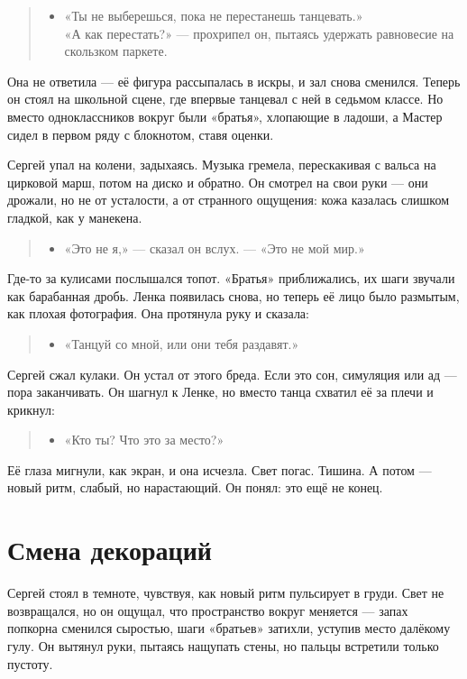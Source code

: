 \documentclass[12pt,a4paper]{book}
\newenvironment{dialogue}{\begin{quote}\itshape\begin{itemize}\item[]}{\end{itemize}\end{quote}}
\begin{document}
\begin{dialogue}
«Ты не выберешься, пока не перестанешь танцевать.» \\
«А как перестать?» --- прохрипел он, пытаясь удержать равновесие на скользком паркете.
\end{dialogue}

Она не ответила --- её фигура рассыпалась в искры, и зал снова сменился. Теперь он стоял на школьной сцене, где впервые танцевал с ней в седьмом классе. Но вместо одноклассников вокруг были «братья», хлопающие в ладоши, а Мастер сидел в первом ряду с блокнотом, ставя оценки.

Сергей упал на колени, задыхаясь. Музыка гремела, перескакивая с вальса на цирковой марш, потом на диско и обратно. Он смотрел на свои руки --- они дрожали, но не от усталости, а от странного ощущения: кожа казалась слишком гладкой, как у манекена.

\begin{dialogue}
«Это не я,» --- сказал он вслух. --- «Это не мой мир.»
\end{dialogue}

Где-то за кулисами послышался топот. «Братья» приближались, их шаги звучали как барабанная дробь. Ленка появилась снова, но теперь её лицо было размытым, как плохая фотография. Она протянула руку и сказала:

\begin{dialogue}
«Танцуй со мной, или они тебя раздавят.»
\end{dialogue}

Сергей сжал кулаки. Он устал от этого бреда. Если это сон, симуляция или ад --- пора заканчивать. Он шагнул к Ленке, но вместо танца схватил её за плечи и крикнул:

\begin{dialogue}
«Кто ты? Что это за место?»
\end{dialogue}

Её глаза мигнули, как экран, и она исчезла. Свет погас. Тишина. А потом --- новый ритм, слабый, но нарастающий. Он понял: это ещё не конец.

\section{Смена декораций}

Сергей стоял в темноте, чувствуя, как новый ритм пульсирует в груди. Свет не возвращался, но он ощущал, что пространство вокруг меняется --- запах попкорна сменился сыростью, шаги «братьев» затихли, уступив место далёкому гулу. Он вытянул руки, пытаясь нащупать стены, но пальцы встретили только пустоту.
\end{document}
